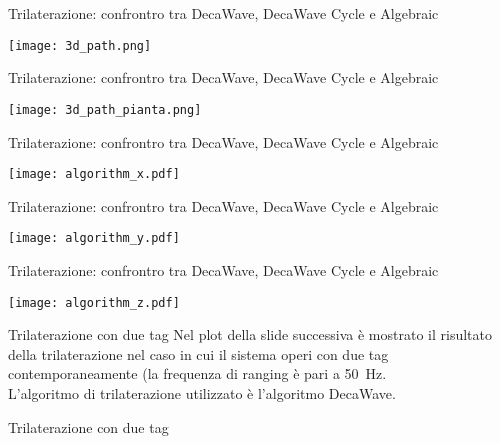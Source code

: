 \begin{frame}{Trilaterazione: confrontro tra DecaWave, DecaWave Cycle e Algebraic}
  \begin{center}
    \texttt{[image: 3d\_path.png]}
  \end{center}
\end{frame}

\begin{frame}{Trilaterazione: confrontro tra DecaWave, DecaWave Cycle e Algebraic}
  \begin{center}
    \texttt{[image: 3d\_path\_pianta.png]}
  \end{center}
\end{frame}

\begin{frame}{Trilaterazione: confrontro tra DecaWave, DecaWave Cycle e Algebraic}
  \begin{center}
    \texttt{[image: algorithm\_x.pdf]}
  \end{center}
\end{frame}

\begin{frame}{Trilaterazione: confrontro tra DecaWave, DecaWave Cycle e Algebraic}
  \begin{center}
    \texttt{[image: algorithm\_y.pdf]}
  \end{center}
\end{frame}

\begin{frame}{Trilaterazione: confrontro tra DecaWave, DecaWave Cycle e Algebraic}
  \begin{center}
    \texttt{[image: algorithm\_z.pdf]}
  \end{center}
\end{frame}

\begin{frame}{Trilaterazione con due tag}
  Nel plot della slide successiva è mostrato il risultato della trilaterazione nel caso in cui il sistema
  operi con due tag contemporaneamente (la frequenza di ranging è pari a \SI{50}{\hertz}.\\
  L'algoritmo di trilaterazione utilizzato è l'algoritmo DecaWave.
\end{frame}

\begin{frame}{Trilaterazione con due tag}
  \begin{center}
  \end{center}
\end{frame}

